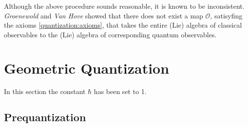     Although the above procedure sounds reasonable, it is known to be inconsistent. \textit{Groenewold} and \textit{Van Hove} showed that there does not exist a map $\mathcal{O}$, satisyfing the axioms \ref{quantization:axioms}, that takes the entire (Lie) algebra of classical observables to the (Lie) algebra of corresponding quantum observables.

\section{Geometric Quantization}\label{section:geometric_quantization}

    In this section the constant $\hbar$ has been set to 1.

\subsection{Prequantization}

